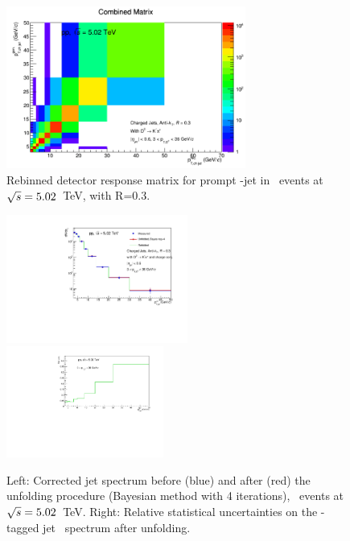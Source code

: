 \begin{figure}[bth]
\centering
\includegraphics[width=0.7\textwidth]{pPbcuts_2sig/ProdMatrixRebin}
\caption{Rebinned detector response matrix for prompt \Dzero-jet in \pp\ events at $\sqrt{s}=5.02$~TeV, with R=0.3.}
\label{fig:pPb_ResponseMatrix_Dzero}
\end{figure}

\begin{figure}[bth]
\centering
\includegraphics[width=0.53\textwidth]{pPbcuts_2sig/unfoldedSpectrum_UnfSpectrum}
\includegraphics[width=0.46\textwidth]{pPbcuts_2sig/unfoldedSpectrum_UnfSpectrum_unc}
\caption{Left: Corrected jet \pt spectrum before (blue) and after (red) the unfolding procedure (Bayesian method with 4 iterations), \pp\ events at $\sqrt{s}=5.02$~TeV. Right: Relative statistical uncertainties on the \Dzero-tagged jet \pt\ spectrum after unfolding.}
\label{fig:UnfSpec_pPb_Dzero}
\end{figure}

